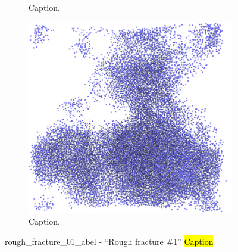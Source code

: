 \begin{figure}[htpb]
\begin{subfigure}[b]{\myfigwidth}
        \caption{Caption.}%
    \end{subfigure}%
    \hfill%
    \begin{subfigure}[b]{\myfigwidth}%
        \centering%
        \includegraphics[width=\textwidth]{images/systems/trimmed-rough_fracture01_abel_17}%
        \caption{Caption.}%
    \end{subfigure}%
    \caption{%
        rough\_fracture\_01\_abel - ``Rough fracture \#1'' \hl{Caption} %
        \label{fig:renderings_rough_fracture01_abel}%
    }%
\end{figure}%

